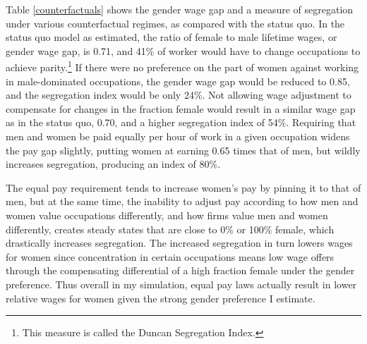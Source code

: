 \documentclass[12pt]{article}
\begin{document}
Table \ref{counterfactuals} shows the gender wage gap and a measure of segregation under various counterfactual regimes, as compared with the status quo. In the status quo model as estimated, the ratio of female to male lifetime wages, or gender wage gap, is 0.71, and 41\% of worker would have to change occupations to achieve parity.\footnote{This measure is called the Duncan Segregation Index.} If there were no preference on the part of women against working in male-dominated occupations, the gender wage gap would be reduced to 0.85, and the segregation index would be only 24\%. Not allowing wage adjustment to compensate for changes in the fraction female would result in a similar wage gap as in the status quo, 0.70, and a higher segregation index of 54\%. Requiring that men and women be paid equally per hour of work in a given occupation widens the pay gap slightly, putting women at earning 0.65 times that of men, but wildly increases segregation, producing an index of 80\%. 

The equal pay requirement tends to increase women's pay by pinning it to that of men, but at the same time, the inability to adjust pay according to how men and women value occupations differently, and how firms value men and women differently, creates steady states that are close to 0\% or 100\% female, which drastically increases segregation. The increased segregation in turn lowers wages for women since concentration in certain occupations means low wage offers through the compensating differential of a high fraction female under the gender preference. Thus overall in my simulation, equal pay laws actually result in lower relative wages for women given the strong gender preference I estimate.











\end{document}
